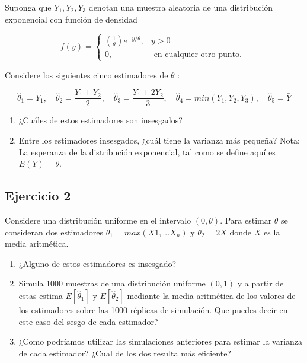 \documentclass[
]{article}
\providecommand{\tightlist}{%
  \setlength{\itemsep}{0pt}\setlength{\parskip}{0pt}}
\begin{document}
Suponga que \(Y_{1}, Y_{2}, Y_{3}\) denotan una muestra aleatoria de una distribución exponencial con función de densidad

\[
f(y)= \begin{cases}\left(\frac{1}{\theta}\right) e^{-y / \theta}, & y>0 \\ 0, & \text { en cualquier otro punto. }\end{cases}
\]

Considere los siguientes cinco estimadores de \(\theta\) :

\[
\hat{\theta}_{1}=Y_{1}, \quad \hat{\theta}_{2}=\frac{Y_{1}+Y_{2}}{2}, \quad \hat{\theta}_{3}=\frac{Y_{1}+2 Y_{2}}{3}, \quad \hat{\theta}_{4}=min\left(Y_{1}, Y_{2}, Y_{3}\right), \quad \hat{\theta}_{5}=\bar{Y}
\]

\begin{enumerate}
\def\labelenumi{\alph{enumi}.}
\tightlist
\item
  ¿Cuáles de estos estimadores son insesgados?
\item
  Entre los estimadores insesgados, ¿cuál tiene la varianza más pequeña?
  Nota: La esperanza de la distribución exponencial, tal como se define aquí es \(E(Y)= \theta\).
\end{enumerate}

\subsection{Ejercicio 2}\label{ejercicio-2-2}

Considere una distribución uniforme en el intervalo \((0, \theta)\). Para estimar \(\theta\) se consideran dos estimadores \(\theta_1 = max(X1,...X_n)\) y \(\theta_2 = 2 \overline{X}\) donde \(\overline{X}\) es la media aritmética.

\begin{enumerate}
\def\labelenumi{\alph{enumi}.}
\tightlist
\item
  ¿Alguno de estos estimadores es insesgado?
\item
  Simula 1000 muestras de una distribución uniforme \((0,1)\) y a partir de estas estima \(E[\hat \theta_1]\) y \(E[\hat \theta_2 ]\) mediante la media aritmética de los valores de los estimadores sobre las 1000 réplicas de simulación. Que puedes decir en este caso del sesgo de cada estimador?
\item
  ¿Como podríamos utilizar las simulaciones anteriores para estimar la varianza de cada estimador? ¿Cual de los dos resulta más eficiente?
\end{enumerate}
\end{document}
